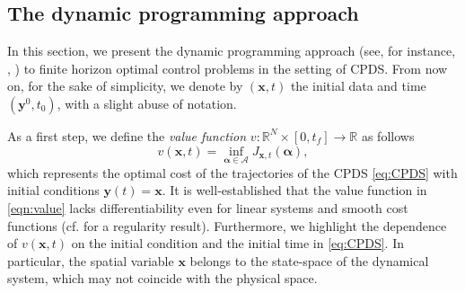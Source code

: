 \documentclass[10pt]{article}
\theoremstyle{remark}
\newcommand{\R}{\mathbb{R}}
\newcommand{\A}{\mathcal{A}}
\theoremstyle{definition}
\theoremstyle{remark}
\begin{document}
\subsection{The dynamic programming approach}\label{subsec:DPP}

In this section, we present the dynamic programming approach (see, for instance, \cite{Bellman1957, BardiCapuzzoDocetta2008}, \cite[Chapter 8]{FalconeFerretti}) to finite horizon optimal control problems in the setting of CPDS. From now on, for the sake of simplicity, we denote by $(\bm{x}, t)$ the initial data and time $(\bm{y}^0, t_0)$, with a slight abuse of notation.
 
As a first step, we define the \textit{value function} $v : \R^N \times [0, t_f] \to \R$ as follows
\begin{equation} \label{eqn:value}
v(\bm{x},t) = \inf_{\bm{\alpha} \in \A} J_{\bm{x},t} (\bm{\alpha}),
\end{equation}
which represents the optimal cost of the trajectories of the CPDS \eqref{eq:CPDS} with initial conditions $\bm{y}(t)=\bm{x}$. It is well-established that the value function in \eqref{eqn:value} lacks differentiability even for linear systems and smooth cost functions (cf. \cite[Proposition 3.1]{BardiCapuzzoDocetta2008} for a regularity result). Furthermore, we highlight the dependence of $v(\bm{x},t)$ on the initial condition and the initial time in \eqref{eq:CPDS}. In particular, the spatial variable $\bm{x}$ belongs to the state-space of the dynamical system, which may not coincide with the physical space.
\end{document}
